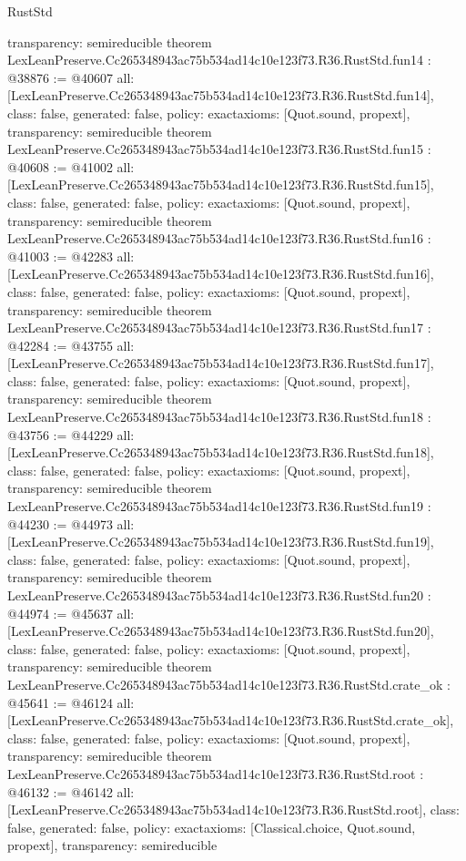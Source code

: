 \begin{lexlean}{RustStd}
\begin{coremodule}
{  transparency: semireducible
}
theorem LexLeanPreserve.Cc265348943ac75b534ad14c10e123f73.R36.RustStd.fun14 : @38876 := @40607 {
  all: [LexLeanPreserve.Cc265348943ac75b534ad14c10e123f73.R36.RustStd.fun14],
  class: false,
  generated: false,
  policy: exact{axioms: [Quot.sound, propext]},
  transparency: semireducible
}
theorem LexLeanPreserve.Cc265348943ac75b534ad14c10e123f73.R36.RustStd.fun15 : @40608 := @41002 {
  all: [LexLeanPreserve.Cc265348943ac75b534ad14c10e123f73.R36.RustStd.fun15],
  class: false,
  generated: false,
  policy: exact{axioms: [Quot.sound, propext]},
  transparency: semireducible
}
theorem LexLeanPreserve.Cc265348943ac75b534ad14c10e123f73.R36.RustStd.fun16 : @41003 := @42283 {
  all: [LexLeanPreserve.Cc265348943ac75b534ad14c10e123f73.R36.RustStd.fun16],
  class: false,
  generated: false,
  policy: exact{axioms: [Quot.sound, propext]},
  transparency: semireducible
}
theorem LexLeanPreserve.Cc265348943ac75b534ad14c10e123f73.R36.RustStd.fun17 : @42284 := @43755 {
  all: [LexLeanPreserve.Cc265348943ac75b534ad14c10e123f73.R36.RustStd.fun17],
  class: false,
  generated: false,
  policy: exact{axioms: [Quot.sound, propext]},
  transparency: semireducible
}
theorem LexLeanPreserve.Cc265348943ac75b534ad14c10e123f73.R36.RustStd.fun18 : @43756 := @44229 {
  all: [LexLeanPreserve.Cc265348943ac75b534ad14c10e123f73.R36.RustStd.fun18],
  class: false,
  generated: false,
  policy: exact{axioms: [Quot.sound, propext]},
  transparency: semireducible
}
theorem LexLeanPreserve.Cc265348943ac75b534ad14c10e123f73.R36.RustStd.fun19 : @44230 := @44973 {
  all: [LexLeanPreserve.Cc265348943ac75b534ad14c10e123f73.R36.RustStd.fun19],
  class: false,
  generated: false,
  policy: exact{axioms: [Quot.sound, propext]},
  transparency: semireducible
}
theorem LexLeanPreserve.Cc265348943ac75b534ad14c10e123f73.R36.RustStd.fun20 : @44974 := @45637 {
  all: [LexLeanPreserve.Cc265348943ac75b534ad14c10e123f73.R36.RustStd.fun20],
  class: false,
  generated: false,
  policy: exact{axioms: [Quot.sound, propext]},
  transparency: semireducible
}
theorem LexLeanPreserve.Cc265348943ac75b534ad14c10e123f73.R36.RustStd.crate_ok : @45641 := @46124 {
  all: [LexLeanPreserve.Cc265348943ac75b534ad14c10e123f73.R36.RustStd.crate_ok],
  class: false,
  generated: false,
  policy: exact{axioms: [Quot.sound, propext]},
  transparency: semireducible
}
theorem LexLeanPreserve.Cc265348943ac75b534ad14c10e123f73.R36.RustStd.root : @46132 := @46142 {
  all: [LexLeanPreserve.Cc265348943ac75b534ad14c10e123f73.R36.RustStd.root],
  class: false,
  generated: false,
  policy: exact{axioms: [Classical.choice, Quot.sound, propext]},
  transparency: semireducible
}


\end{coremodule}
\end{lexlean}
